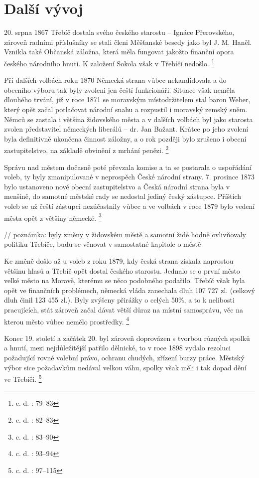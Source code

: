 \documentclass[a4paper,oneside,12p]{report}
\begin{document}
\section{Další vývoj}

20. srpna 1867 Třebíč dostala svého českého starostu -- Ignáce Přerovského, zároveň radními příslušníky se stali členi Měšťanské besedy jako byl J. M. Haněl.
Vznikla také Občanská záložna, která měla fungovat jakožto finanční opora českého národního hnutí.
K založení Sokola však v Třebíči nedošlo. \footnote{c. d. : 79--83}

Při dalších volbách roku 1870 Německá strana vůbec nekandidovala a do obecního výboru tak byly zvoleni jen čeští funkcionáři.
Situace však neměla dlouhého trvání, již v roce 1871 se moravským místodržitelem stal baron Weber, který opět začal potlačovat národní snahu a rozpustil i moravský zemský sněm.
Němců se zastala i většina židovského města a v dalších volbách byl jako starosta zvolen představitel německých liberálů -- dr. Jan Bažant.
Krátce po jeho zvolení byla definitivně ukončena činnost záložny, a o rok později bylo zrušeno i obecní zastupitelstvo, na základě obvinění z mrhání penězi. \footnote{c. d. : 82--83}

Správu nad městem dočasně poté převzala komise a ta se postarala o uspořádání voleb, ty byly zmanipulované v neprospěch České národní strany.
7. prosince 1873 bylo ustanoveno nové obecní zastupitelstvo a Česká národní strana byla v menšině, do samotné městské rady se nedostal jediný český zástupce.
Příštích voleb se už čeští zástupci nezúčastnily vůbec a ve volbách v roce 1879 bylo vedení města opět z většiny německé. \footnote{c. d. : 83--90}

// poznámka: byly změny v židovském městě a samotní židé hodně ovlivňovaly politiku Třebíče, budu se věnovat v samostatné kapitole o městě

Ke změně došlo až u voleb z roku 1879, kdy česká strana získala naprostou většinu hlasů a Třebíč opět dostal českého starostu.
Jednalo se o první město velké město na Moravě, kterému se něco podobného podařilo.
Třebíč však byla opět ve finančních problémech, německá vláda zanechala dluh 107 727 zl. (celkový dluh činil 123 455 zl.).
Byly zvýšeny přirážky o celých 50\%, a to k nelibosti pracujících, stát zároveň začal dávat větší důraz na místní samosprávu, věc na kterou město vůbec nemělo prostředky. \footnote{c. d. : 93--94}

Konec 19. století a začátek 20. byl zároveň doprovázen s tvorbou různých spolků a hnutí, mezi nejdůležitější patřilo dělnické, to v roce 1898 vydalo rezoluci požadující rovné volební právo, ochranu chudých, zřízení burzy práce.
Městský výbor sice požadavkům nedával velkou váhu, spolky však měli i tak dopad dění ve Třebíči. \footnote{c. d. : 97--115}
\end{document}
